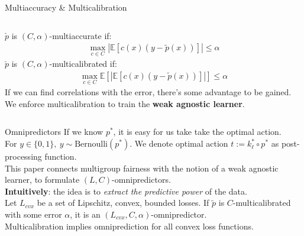 \documentclass{beamer}
\begin{document}
\begin{frame}{Multiaccuracy \& Multicalibration}
\begin{columns}
\begin{column}{0.7\textwidth}
			$\tilde{p}$ is $(C, \alpha)$-multiaccurate if:
			\begin{gather}
				\max_{c \in C} |\mathbb{E}[c(x)(y-\tilde{p}(x))]| \leq \alpha
			\end{gather} \pause %
			$\tilde{p}$ is $(C, \alpha)$-multicalibrated if:
			\begin{gather}
				\max_{c \in C} \mathbb{E}[|\mathbb{E}[c(x)(y-\tilde{p}(x))]|] \leq \alpha
			\end{gather} \pause
			If we can find correlations with the error, there's some advantage to be gained. We enforce multicalibration to train the \textbf{weak agnostic learner}.
		\end{column}
	\end{columns}
\end{frame}

\begin{frame}{Omnipredictors}
	If we know $p^*$, it is easy for us take take the optimal action. \pause \newline \\

	For $y \in \{0, 1\},~y \sim \text{Bernoulli}(p^*)$. We denote optimal action $t := k_\ell^* \circ p^*$ as post-processing function. \pause \newline \\

	This paper connects multigroup fairness with the notion of a weak agnostic learner, to formulate $(L, C)$-omnipredictors. \pause \newline \\

	\textbf{Intuitively}: the idea is to \textit{extract the predictive power} of the data. \pause \newline \\

	Let $L_{cvx}$ be a set of Lipschitz, convex, bounded losses. \pause If $\tilde{p}$ is $C$-multicalibrated with some error $\alpha$, it is an $(L_{cvx}, C, \alpha)$-omnipredictor. \pause \newline \\

	Multicalibration implies omniprediction for all convex loss functions.
\end{frame}
\end{document}
